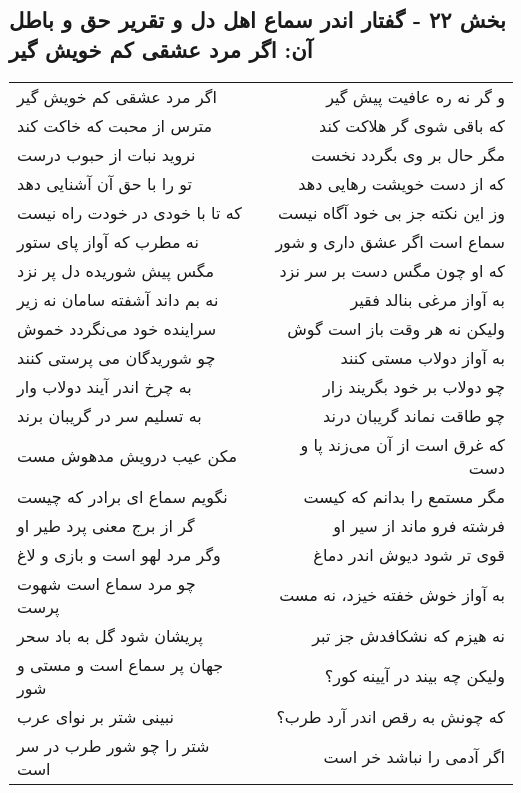 \begin{center}
\section*{بخش ۲۲ - گفتار اندر سماع اهل دل و تقریر حق و باطل آن: اگر مرد عشقی کم خویش گیر}
\label{sec:022}
\begin{longtable}{l p{0.5cm} r}
اگر مرد عشقی کم خویش گیر
&&
و گر نه ره عافیت پیش گیر
\\
مترس از محبت که خاکت کند
&&
که باقی شوی گر هلاکت کند
\\
نروید نبات از حبوب درست
&&
مگر حال بر وی بگردد نخست
\\
تو را با حق آن آشنایی دهد
&&
که از دست خویشت رهایی دهد
\\
که تا با خودی در خودت راه نیست
&&
وز این نکته جز بی خود آگاه نیست
\\
نه مطرب که آواز پای ستور
&&
سماع است اگر عشق داری و شور
\\
مگس پیش شوریده دل پر نزد
&&
که او چون مگس دست بر سر نزد
\\
نه بم داند آشفته سامان نه زیر
&&
به آواز مرغی بنالد فقیر
\\
سراینده خود می‌نگردد خموش
&&
ولیکن نه هر وقت باز است گوش
\\
چو شوریدگان می پرستی کنند
&&
به آواز دولاب مستی کنند
\\
به چرخ اندر آیند دولاب وار
&&
چو دولاب بر خود بگریند زار
\\
به تسلیم سر در گریبان برند
&&
چو طاقت نماند گریبان درند
\\
مکن عیب درویش مدهوش مست
&&
که غرق است از آن می‌زند پا و دست
\\
نگویم سماع ای برادر که چیست
&&
مگر مستمع را بدانم که کیست
\\
گر از برج معنی پرد طیر او
&&
فرشته فرو ماند از سیر او
\\
وگر مرد لهو است و بازی و لاغ
&&
قوی تر شود دیوش اندر دماغ
\\
چو مرد سماع است شهوت پرست
&&
به آواز خوش خفته خیزد، نه مست
\\
پریشان شود گل به باد سحر
&&
نه هیزم که نشکافدش جز تبر
\\
جهان پر سماع است و مستی و شور
&&
ولیکن چه بیند در آیینه کور؟
\\
نبینی شتر بر نوای عرب
&&
که چونش به رقص اندر آرد طرب؟
\\
شتر را چو شور طرب در سر است
&&
اگر آدمی را نباشد خر است
\\
\end{longtable}
\end{center}
